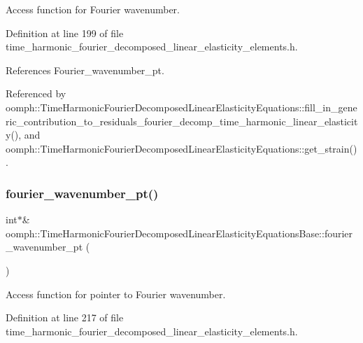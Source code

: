 Access function for Fourier wavenumber. 



Definition at line 199 of file time\+\_\+harmonic\+\_\+fourier\+\_\+decomposed\+\_\+linear\+\_\+elasticity\+\_\+elements.\+h.



References Fourier\+\_\+wavenumber\+\_\+pt.



Referenced by oomph\+::\+Time\+Harmonic\+Fourier\+Decomposed\+Linear\+Elasticity\+Equations\+::fill\+\_\+in\+\_\+generic\+\_\+contribution\+\_\+to\+\_\+residuals\+\_\+fourier\+\_\+decomp\+\_\+time\+\_\+harmonic\+\_\+linear\+\_\+elasticity(), and oomph\+::\+Time\+Harmonic\+Fourier\+Decomposed\+Linear\+Elasticity\+Equations\+::get\+\_\+strain().

\mbox{\label{classoomph_1_1TimeHarmonicFourierDecomposedLinearElasticityEquationsBase_aef8b8fd381c219d23dc52eb219f4f643}} 
\subsubsection{\texorpdfstring{fourier\+\_\+wavenumber\+\_\+pt()}{fourier\_wavenumber\_pt()}}
{\footnotesize\ttfamily int$\ast$\& oomph\+::\+Time\+Harmonic\+Fourier\+Decomposed\+Linear\+Elasticity\+Equations\+Base\+::fourier\+\_\+wavenumber\+\_\+pt (\begin{DoxyParamCaption}{ }\end{DoxyParamCaption})\hspace{0.3cm}{\ttfamily [inline]}}



Access function for pointer to Fourier wavenumber. 



Definition at line 217 of file time\+\_\+harmonic\+\_\+fourier\+\_\+decomposed\+\_\+linear\+\_\+elasticity\+\_\+elements.\+h.



